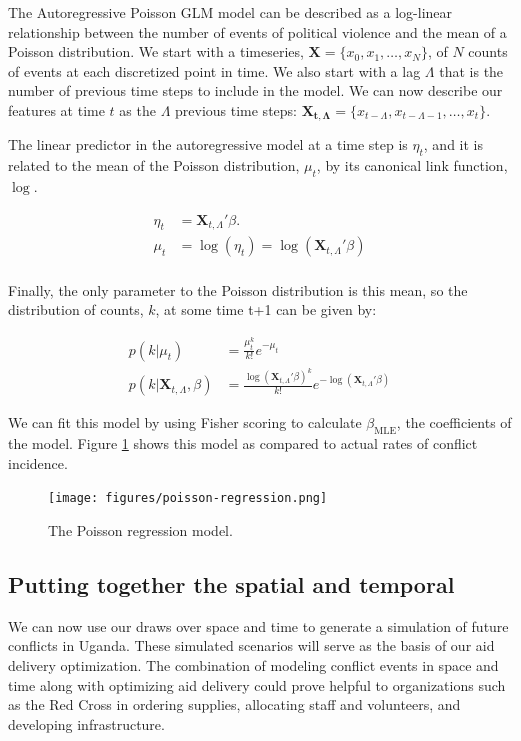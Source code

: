\documentclass{article} %
\begin{document}
The Autoregressive Poisson GLM model can be described as a log-linear relationship between the number of events of political violence and the mean of a Poisson distribution. We start with a timeseries, $\mathbf{X} = \{x_0, x_1,\hdots, x_N\}$, of $N$ counts of events at each discretized point in time. We also start with a lag $\Lambda$ that is the number of previous time steps to include in the model. We can now describe our features at time $t$ as the $\Lambda$ previous time steps: $\mathbf{X_{t, \Lambda}} = \{x_{t-\Lambda}, x_{t-\Lambda-1},\hdots, x_t\}$.

The linear predictor in the autoregressive model at a time step is $\eta_t$, and it is related to the mean of the Poisson distribution, $\mu_t$, by its canonical link function, $\log$.

\begin{align*}
\eta_t &= \mathbf{X}_{t, \Lambda}'\beta. \\
\mu_t &= \log(\eta_t) = \log(\mathbf{X}_{t, \Lambda}'\beta) \\
\end{align*}

Finally, the only parameter to the Poisson distribution is this mean, so the distribution of counts, $k$, at some time t+1 can be given by:

\begin{align*}
p(k | \mu_t) &= \frac{\mu_t^k}{k!}e^{-\mu_t} \\
p(k | \mathbf{X}_{t, \Lambda}, \beta) &= \frac{\log(\mathbf{X}_{t, \Lambda}'\beta)^k}{k!}e^{-\log(\mathbf{X}_{t, \Lambda}'\beta)} 
\end{align*}

We can fit this model by using Fisher scoring to calculate $\beta_\mathrm{MLE}$, the coefficients of the model. Figure \ref{fig:poisson} shows this model as compared to actual rates of conflict incidence.

\begin{figure}
\centering
\texttt{[image: figures/poisson-regression.png]}
\caption{The Poisson regression model.}
\label{fig:poisson}
\end{figure}

\subsection{Putting together the spatial and temporal}

We can now use our draws over space and time to generate a simulation of future conflicts in Uganda. These simulated scenarios will serve as the basis of our aid delivery optimization. The combination of modeling conflict events in space and time along with optimizing aid delivery could prove helpful to organizations such as the Red Cross in ordering supplies, allocating staff and volunteers, and developing infrastructure.
\end{document}
